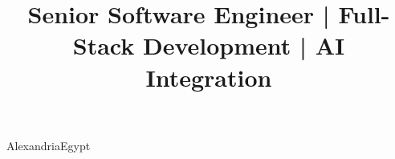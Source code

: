 
\title{\small Senior Software Engineer | Full-Stack Development | AI Integration}
\address{}{Alexandria}{Egypt}

